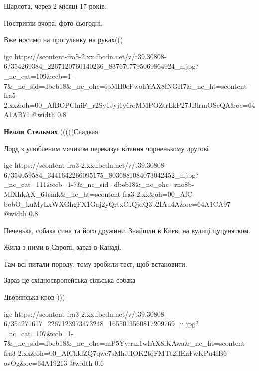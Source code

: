 
Шарлота, через 2 місяці 17 років.

Постригли вчора, фото сьогодні.

Вже носимо на прогулянку на руках(((

\ifcmt
  igc https://scontent-fra5-2.xx.fbcdn.net/v/t39.30808-6/354269384_2267120760140236_8376707795069864924_n.jpg?_nc_cat=109&ccb=1-7&_nc_sid=dbeb18&_nc_ohc=ipMH0oPwohYAX8fNGH7&_nc_ht=scontent-fra5-2.xx&oh=00_AfBOPClniF_r2Sy1Jyj1y6roMMPOZtrLkP27JBlrmOSeQA&oe=64A1AB71
	@width 0.8
\fi

\begin{itemize} %
\textbf{Нелли Стельмах} (((((Сладкая
\end{itemize} %


Лорд з улюбленим мячиком переказує вітання чорненькому другові 🐾

\ifcmt
  igc https://scontent-fra3-2.xx.fbcdn.net/v/t39.30808-6/354059584_3441642266095175_8036881084073042452_n.jpg?_nc_cat=111&ccb=1-7&_nc_sid=dbeb18&_nc_ohc=rno8b-MfXhkAX_6Jsmk&_nc_ht=scontent-fra3-2.xx&oh=00_AfC-bobO_kuMyLxWXGhgFX1Gaj2yQrtxCkQjdQ3b2IAu4A&oe=64A1CA97
	@width 0.8
\fi


Печенька, собака сина та його дружини. Знайшли в Києві на вулиці цуцунятком.\par
Жила з ними в Європі, зараз в Канаді.\par
Там всі питали породу, тому зробили тест, щоб встановити.\par
Зараз це східноєвропейська сільська собака 🙂\par
Дворянська кров )))\par

\ifcmt
  igc https://scontent-fra3-2.xx.fbcdn.net/v/t39.30808-6/354271617_2267123973473248_1655013560817209769_n.jpg?_nc_cat=107&ccb=1-7&_nc_sid=dbeb18&_nc_ohc=mP5Yyrrm1wIAX8lKAwa&_nc_ht=scontent-fra3-2.xx&oh=00_AfCkklZQ7qwe7sMhJHOK2tqFMTt2iIEnFwKPu4IB6-ovOg&oe=64A19213
	@width 0.6
\fi


